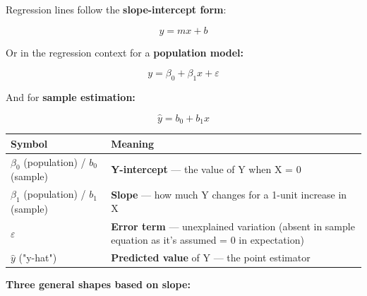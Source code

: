 \documentclass[12pt,openany]{book}
\begin{document}
Regression lines follow the \textbf{slope-intercept form}:

\[
y = mx + b
\]


Or in the regression context for a \textbf{population model:}

\[
y = \beta_0 + \beta_1 x + \varepsilon
\]


And for \textbf{sample estimation:}

\[
\hat{y} = b_0 + b_1 x
\]


\begin{center}
\small
\renewcommand{\arraystretch}{1.15}
\begin{tabular}{|L{0.28\textwidth}|L{0.60\textwidth}|}
\hline
    Symbol & Meaning \\
\hline
    \(\beta_0\) (population) / \(b_0\) (sample) & \textbf{Y-intercept} --- the value of Y when X = 0 \\
\hline
    \(\beta_1\) (population) / \(b_1\) (sample) & \textbf{Slope} --- how much Y changes for a 1-unit increase in X \\
\hline
    \(\varepsilon\) & \textbf{Error term} --- unexplained variation (absent in sample equation as it's assumed = 0 in expectation) \\
\hline
    \(\hat{y}\) ("y-hat") & \textbf{Predicted value} of Y --- the point estimator \\
\hline
\end{tabular}
\end{center}
\normalsize


\textbf{Three general shapes based on slope:}


\begin{center}
\end{center}
\end{document}
